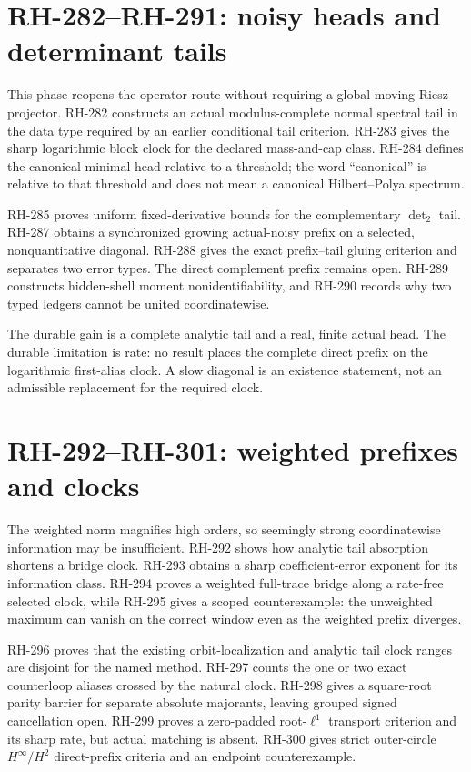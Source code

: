 \documentclass[11pt]{article}
\theoremstyle{definition}
\theoremstyle{remark}
\begin{document}
\section{RH-282--RH-291: noisy heads and determinant tails}

This phase reopens the operator route without requiring a global moving
Riesz projector.  RH-282 constructs an actual modulus-complete normal
spectral tail in the data type required by an earlier conditional tail
criterion.  RH-283 gives the sharp logarithmic block clock for the declared
mass-and-cap class.  RH-284 defines the canonical minimal head relative to a
threshold; the word ``canonical'' is relative to that threshold and does not
mean a canonical Hilbert--Polya spectrum.

RH-285 proves uniform fixed-derivative bounds for the complementary
$\det_2$ tail.  RH-287 obtains a synchronized growing actual-noisy prefix on
a selected, nonquantitative diagonal.  RH-288 gives the exact prefix--tail
gluing criterion and separates two error types.  The direct complement
prefix remains open.  RH-289 constructs hidden-shell moment
nonidentifiability, and RH-290 records why two typed ledgers cannot be united
coordinatewise.

The durable gain is a complete analytic tail and a real, finite actual head.
The durable limitation is rate: no result places the complete direct prefix
on the logarithmic first-alias clock.  A slow diagonal is an existence
statement, not an admissible replacement for the required clock.

\section{RH-292--RH-301: weighted prefixes and clocks}

The weighted norm magnifies high orders, so seemingly strong coordinatewise
information may be insufficient.  RH-292 shows how analytic tail absorption
shortens a bridge clock.  RH-293 obtains a sharp coefficient-error exponent
for its information class.  RH-294 proves a weighted full-trace bridge along
a rate-free selected clock, while RH-295 gives a scoped counterexample: the
unweighted maximum can vanish on the correct window even as the weighted
prefix diverges.

RH-296 proves that the existing orbit-localization and analytic tail clock
ranges are disjoint for the named method.  RH-297 counts the one or two exact
counterloop aliases crossed by the natural clock.  RH-298 gives a square-root
parity barrier for separate absolute majorants, leaving grouped signed
cancellation open.  RH-299 proves a zero-padded root-$\ell^1$ transport
criterion and its sharp rate, but actual matching is absent.  RH-300 gives
strict outer-circle $H^\infty/H^2$ direct-prefix criteria and an endpoint
counterexample.
\end{document}
